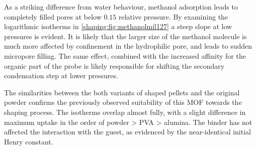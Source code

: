 As a striking difference from water behaviour, methanol adsorption
leads to completely filled pores at below \(0.15\) relative 
pressure. By examining the logarithmic isotherms in 
\autoref{shaping:fig:methanolmil127} a steep slope at low
pressures is evident. It is likely that the larger size of the
methanol molecule is much more affected by confinement in 
the hydrophilic pore, and leads to sudden micropore filling.
The same effect, combined with the increased affinity for the 
organic part of the probe is likely responsible for shifting the 
secondary condensation step at lower pressures.

The similarities between the both variants of shaped pellets 
and the original powder confirms the previously observed 
suitability of this \gls{MOF} towards the shaping process. The isotherms
overlap almost fully, with a slight difference in maximum uptake
in the order of powder > \gls{PVA} > alumina. The binder has not affected
the interaction with the guest, as evidenced by the near-identical
initial Henry constant.